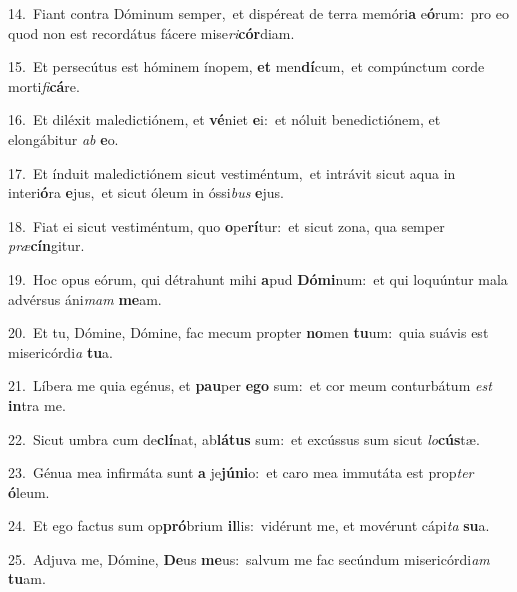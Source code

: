 {\numbfont\textcolor{\numbcolor}{14.}}~Fiant contra Dóminum semper,~\dagger et dispéreat de terra memóri\textbf{a} e\-\textbf{ó}\-rum:~\star pro eo quod non est recordátus fácere mise\-\textit{ri}\-\textbf{cór}diam.\par
{\numbfont\textcolor{\numbcolor}{15.}}~Et persecútus est hóminem ínopem, \textbf{et} men\-\textbf{dí}\-cum,~\star et compúnctum corde morti\-\textit{fi}\-\textbf{cá}re.\par
{\numbfont\textcolor{\numbcolor}{16.}}~Et diléxit maledictiónem, et \textbf{vé}\-niet \textbf{e}\-i:~\star et nóluit benedictiónem, et elongábitur \textit{ab} \textbf{e}\-o.\par
{\numbfont\textcolor{\numbcolor}{17.}}~Et índuit maledictiónem sicut vestiméntum,~\dagger et intrávit sicut aqua in interi\-\textbf{ó}\-ra \textbf{e}\-jus,~\star et sicut óleum in óssi\textit{bus} \textbf{e}\-jus.\par
{\numbfont\textcolor{\numbcolor}{18.}}~Fiat ei sicut vestiméntum, quo \textbf{o}\-pe\-\textbf{rí}\-tur:~\star et sicut zona, qua semper \textit{præ}\-\textbf{cín}gitur.\par
{\numbfont\textcolor{\numbcolor}{19.}}~Hoc opus eórum, qui détrahunt mihi \textbf{a}\-pud \textbf{Dó}\-\textbf{mi}num:~\star et qui loquúntur mala advérsus áni\textit{mam} \textbf{me}\-am.\par
{\numbfont\textcolor{\numbcolor}{20.}}~Et tu, Dómine, Dómine, fac mecum propter \textbf{no}\-men \textbf{tu}\-um:~\star quia suávis est misericórdi\textit{a} \textbf{tu}\-a.\par
{\numbfont\textcolor{\numbcolor}{21.}}~Líbera me quia egénus, et \textbf{pau}\-per \textbf{e}\-\textbf{go} sum:~\star et cor meum conturbátum \textit{est} \textbf{in}\-tra me.\par
{\numbfont\textcolor{\numbcolor}{22.}}~Sicut umbra cum de\-\textbf{clí}\-nat, ab\-\textbf{lá}\-\textbf{tus} sum:~\star et excússus sum sicut \textit{lo}\-\textbf{cús}tæ.\par
{\numbfont\textcolor{\numbcolor}{23.}}~Génua mea infirmáta sunt \textbf{a} je\-\textbf{jú}\-\textbf{ni}o:~\star et caro mea immutáta est prop\textit{ter} \textbf{ó}\-leum.\par
{\numbfont\textcolor{\numbcolor}{24.}}~Et ego factus sum op\-\textbf{pró}\-brium \textbf{il}\-lis:~\star vidérunt me, et movérunt cápi\textit{ta} \textbf{su}\-a.\par
{\numbfont\textcolor{\numbcolor}{25.}}~Adjuva me, Dómine, \textbf{De}\-us \textbf{me}\-us:~\star salvum me fac secúndum misericórdi\textit{am} \textbf{tu}\-am.\par
